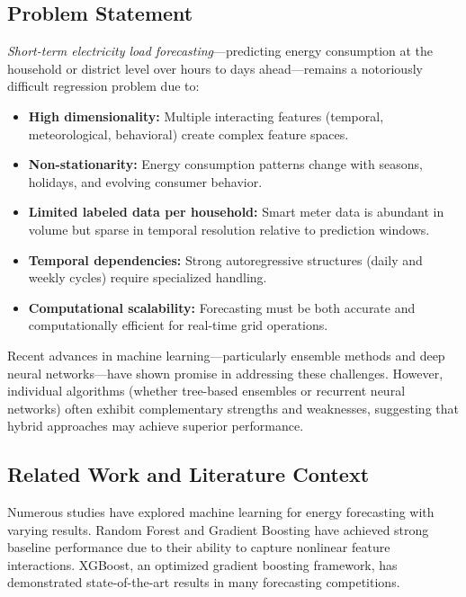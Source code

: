 \subsection{Problem Statement}

\textit{Short-term electricity load forecasting}—predicting energy consumption at the household or district level over hours to days ahead—remains a notoriously difficult regression problem due to:

\begin{itemize}
    \item \textbf{High dimensionality:} Multiple interacting features (temporal, meteorological, behavioral) create complex feature spaces.
    \item \textbf{Non-stationarity:} Energy consumption patterns change with seasons, holidays, and evolving consumer behavior.
    \item \textbf{Limited labeled data per household:} Smart meter data is abundant in volume but sparse in temporal resolution relative to prediction windows.
    \item \textbf{Temporal dependencies:} Strong autoregressive structures (daily and weekly cycles) require specialized handling.
    \item \textbf{Computational scalability:} Forecasting must be both accurate and computationally efficient for real-time grid operations\cite{Lago2018Forecasting}.
\end{itemize}

Recent advances in machine learning—particularly ensemble methods and deep neural networks—have shown promise in addressing these challenges. However, individual algorithms (whether tree-based ensembles or recurrent neural networks) often exhibit complementary strengths and weaknesses, suggesting that hybrid approaches may achieve superior performance\cite{Kraemer2019LSTMNeural}.


\subsection{Related Work and Literature Context}

Numerous studies have explored machine learning for energy forecasting with varying results. Random Forest and Gradient Boosting have achieved strong baseline performance due to their ability to capture nonlinear feature interactions\cite{Friedman2001GreedyFunction}. XGBoost, an optimized gradient boosting framework, has demonstrated state-of-the-art results in many forecasting competitions\cite{Chen2016XGBoost}. 

